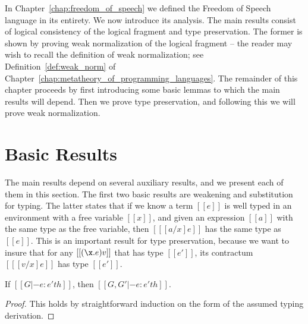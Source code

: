 In Chapter~\ref{chap:freedom_of_speech} we defined the Freedom of
Speech language in its entirety.  We now introduce its analysis.  The
main results consist of logical consistency of the logical fragment
and type preservation.  The former is shown by proving weak
normalization of the logical fragment -- the reader may wish to recall
the definition of weak normalization; see
Definition~\ref{def:weak_norm} of
Chapter~\ref{chap:metatheory_of_programming_languages}.  The remainder
of this chapter proceeds by first introducing some basic lemmas to
which the main results will depend.  Then we prove type preservation,
and following this we will prove weak normalization.

\section{Basic Results}
\label{sec:basic_results}
The main results depend on several auxiliary results, and we present
each of them in this section. The first two basic results are
weakening and substitution for typing.  The latter states that if we
know a term $[[e]]$ is well typed in an environment with a free
variable $[[x]]$, and given an expression $[[a]]$ with the same type
as the free variable, then $[[ [a/x]e]]$ has the same type as $[[e]]$.
This is an important result for type preservation, because we want to
insure that for any $[[(\x.e) v]]$ that has type $[[e']]$, its
contractum $[[ [v/x]e]]$ has type $[[e']]$.

\begin{lemma}[Weakening]
  \label{lemma:FS-weakening}
  If $[[G |- e : e' th]]$, then $[[G, G' |- e : e' th]]$.
\end{lemma}
\begin{proof}
  This holds by straightforward induction on the form of the assumed
  typing derivation.
\end{proof}

